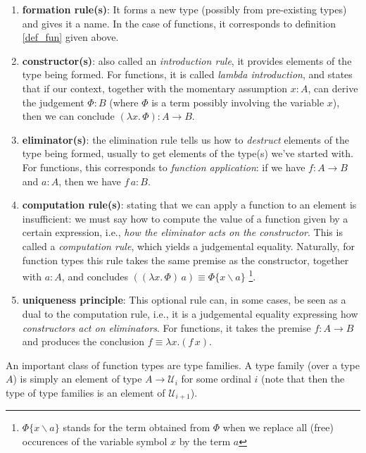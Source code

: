 \documentclass[12 pt]{amsart}
\theoremstyle{definition}
\theoremstyle{remark}
\newcommand{\Type}{\mathcal{U}}
\begin{document}
\begin{enumerate}
    \item \textbf{formation rule(s)}: It forms a new type (possibly from pre-existing types) and gives it a name. In the case of functions, it corresponds to definition \ref{def_fun} given above.
    
    \item \textbf{constructor(s)}: also called an \textit{introduction rule}, it provides elements of the type being formed. For functions, it is called \textit{lambda introduction}, and states that if our context, together with the momentary assumption $x : A$, can derive the judgement $\Phi : B$ (where $\Phi$ is a term possibly involving the variable $x$), then we can conclude $(\lambda x. \,\Phi) : A\to B$.

    \item \textbf{eliminator(s)}: the elimination rule tells us how to \textit{destruct} elements of the type being formed, usually to get elements of the type(s) we've started with. For functions, this corresponds to \textit{function application}: if we have $f : A\to B$ and $a : A$, then we have $f\,a : B$.

    \item \textbf{computation rule(s)}: stating that we can apply a function to an element is insufficient: we must say how to compute the value of a function given by a certain expression, i.e., \textit{how the eliminator acts on the constructor}. This is called a \textit{computation rule}, which yields a judgemental equality. Naturally, for function types this rule takes the same premise as the constructor, together with $a : A$, and concludes $((\lambda x. \,\Phi)\,a) \equiv \Phi\{x\backslash a\} $ \footnote{$\Phi \{x \backslash a\}$ stands for the term obtained from $\Phi$ when we replace all (free) occurences of the variable symbol $x$ by the term $a$}.
    
    \item \textbf{uniqueness principle}: This optional rule can, in some cases, be seen as a dual to the computation rule, i.e., it is a judgemental equality expressing how \textit{constructors act on eliminators}. For functions, it takes the premise $f : A\to B$ and produces the conclusion $f \equiv \lambda x. (f\,x)$.
\end{enumerate}

An important class of function types are type families. A type family (over a type $A$) is simply an element of type $A\to \Type_i$ for some ordinal $i$ (note that then the type of type families is an element of $\Type_{i+1}$). 
\end{document}
